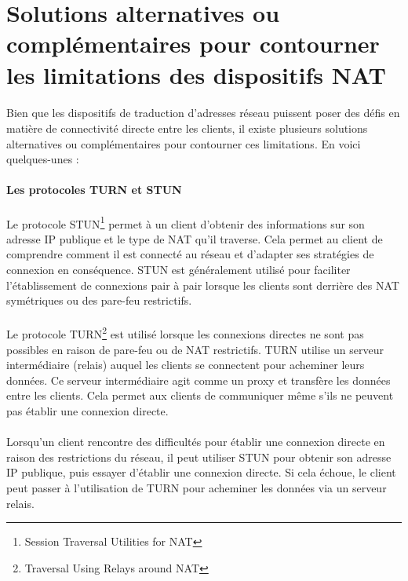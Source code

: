 \section{Solutions alternatives ou complémentaires pour contourner les limitations des dispositifs NAT}

\paragraph{}
Bien que les dispositifs de traduction d'adresses réseau puissent poser des défis en matière de connectivité directe entre les clients, il existe plusieurs solutions alternatives ou complémentaires pour contourner ces limitations. En voici quelques-unes :

\paragraph{Les protocoles TURN et STUN}

\paragraph{}
Le protocole STUN\footnote{Session Traversal Utilities for NAT} permet à un client d'obtenir des informations sur son adresse IP publique et le type de NAT qu'il traverse. Cela permet au client de comprendre comment il est connecté au réseau et d'adapter ses stratégies de 
connexion en conséquence. STUN est généralement utilisé pour faciliter l'établissement de connexions pair à pair lorsque les clients sont derrière des NAT symétriques ou des pare-feu restrictifs.

\paragraph{}
Le protocole TURN\footnote{Traversal Using Relays around NAT} est utilisé lorsque les connexions directes ne sont pas possibles en raison de pare-feu ou de NAT restrictifs. TURN utilise un serveur intermédiaire (relais) auquel les clients se connectent pour acheminer 
leurs données. Ce serveur intermédiaire agit comme un proxy et transfère les données entre les clients. Cela permet aux clients de communiquer même s'ils ne peuvent pas établir une connexion directe.

\paragraph{}
Lorsqu'un client rencontre des difficultés pour établir une connexion directe en raison des restrictions du réseau, il peut utiliser STUN pour obtenir son adresse IP publique, puis essayer d'établir une connexion directe. 
Si cela échoue, le client peut passer à l'utilisation de TURN pour acheminer les données via un serveur relais.

